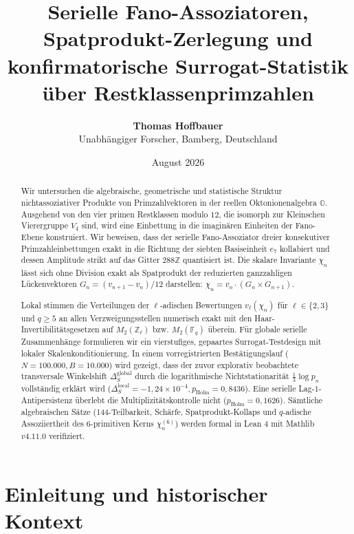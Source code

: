\documentclass[11pt,a4paper]{article}
\title{\textbf{Serielle Fano-Assoziatoren, Spatprodukt-Zerlegung und\\konfirmatorische Surrogat-Statistik über Restklassenprimzahlen}}
\author{\textbf{Thomas Hoffbauer}\\[1ex]
\small Unabhängiger Forscher, Bamberg, Deutschland}
\date{August 2026}
\theoremstyle{plain}
\theoremstyle{definition}
\theoremstyle{remark}
\begin{document}
\maketitle

\begin{abstract}
Wir untersuchen die algebraische, geometrische und statistische Struktur nichtassoziativer Produkte von Primzahlvektoren in der reellen Oktonionenalgebra $\mathbb{O}$. Ausgehend von den vier primen Restklassen modulo $12$, die isomorph zur Kleinschen Vierergruppe $V_4$ sind, wird eine Einbettung in die imaginären Einheiten der Fano-Ebene konstruiert. Wir beweisen, dass der serielle Fano-Assoziator dreier konsekutiver Primzahleinbettungen exakt in die Richtung der siebten Basiseinheit $e_7$ kollabiert und dessen Amplitude strikt auf das Gitter $288\mathbb{Z}$ quantisiert ist. Die skalare Invariante $\chi_n$ lässt sich ohne Division exakt als Spatprodukt der reduzierten ganzzahligen Lückenvektoren $G_n = (v_{n+1}-v_n)/12$ darstellen: $\chi_n = v_n \cdot (G_n \times G_{n+1})$.

Lokal stimmen die Verteilungen der $\ell$-adischen Bewertungen $v_\ell(\chi_n)$ für $\ell \in \{2,3\}$ und $q \ge 5$ an allen Verzweigungsstellen numerisch exakt mit den Haar-Invertibilitätsgesetzen auf $M_2(\mathbb{Z}_\ell)$ bzw. $M_2(\mathbb{F}_q)$ überein. Für globale serielle Zusammenhänge formulieren wir ein vierstufiges, gepaartes Surrogat-Testdesign mit lokaler Skalenkonditionierung. In einem vorregistrierten Bestätigungslauf ($N=100.000, B=10.000$) wird gezeigt, dass der zuvor explorativ beobachtete transversale Winkelshift $\Delta_S^{\mathrm{global}}$ durch die logarithmische Nichtstationarität $\frac{1}{3}\log p_n$ vollständig erklärt wird ($\Delta_S^{\mathrm{local}} = -1{,}24 \times 10^{-4}, p_{\mathrm{Holm}} = 0{,}8436$). Eine serielle Lag-$1$-Antipersistenz überlebt die Multiplizitätskontrolle nicht ($p_{\mathrm{Holm}} = 0{,}1626$). Sämtliche algebraischen Sätze (144-Teilbarkeit, Schärfe, Spatprodukt-Kollaps und $q$-adische Assoziiertheit des $6$-primitiven Kerns $\chi_n^{(6)}$) werden formal in Lean 4 mit Mathlib $v4.11.0$ verifiziert.
\end{abstract}

\tableofcontents

\newpage

\section{Einleitung und historischer Kontext}
\end{document}
